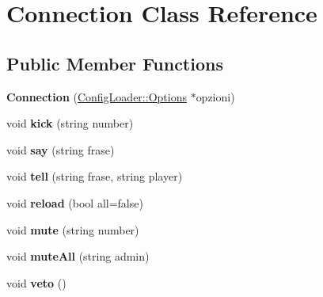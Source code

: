 \hypertarget{class_connection}{
\section{Connection Class Reference}
\label{class_connection}
}
\subsection*{Public Member Functions}
\begin{DoxyCompactItemize}
\item 
\hypertarget{class_connection_a1c52a021de2615a8576c13c5929c5afa}{
{\bfseries Connection} (\hyperlink{class_config_loader_1_1_options}{ConfigLoader::Options} $\ast$opzioni)}
\label{class_connection_a1c52a021de2615a8576c13c5929c5afa}

\item 
\hypertarget{class_connection_a7813b0b020f547355a68d20abadbe26c}{
void {\bfseries kick} (string number)}
\label{class_connection_a7813b0b020f547355a68d20abadbe26c}

\item 
\hypertarget{class_connection_aa4e1b688ca5d68b99a80d89103c28cee}{
void {\bfseries say} (string frase)}
\label{class_connection_aa4e1b688ca5d68b99a80d89103c28cee}

\item 
\hypertarget{class_connection_a5705beaa392572a3d40a23d71ec7811c}{
void {\bfseries tell} (string frase, string player)}
\label{class_connection_a5705beaa392572a3d40a23d71ec7811c}

\item 
\hypertarget{class_connection_ae9d95eb80bd0aceb0cdbb45fb1df3c24}{
void {\bfseries reload} (bool all=false)}
\label{class_connection_ae9d95eb80bd0aceb0cdbb45fb1df3c24}

\item 
\hypertarget{class_connection_ae322505a7c768417ebdb684d6ed84f0f}{
void {\bfseries mute} (string number)}
\label{class_connection_ae322505a7c768417ebdb684d6ed84f0f}

\item 
\hypertarget{class_connection_a10a01f616214d104e7e2acd344441507}{
void {\bfseries muteAll} (string admin)}
\label{class_connection_a10a01f616214d104e7e2acd344441507}

\item 
\hypertarget{class_connection_a47b29878725c5ab019011e182ec1304a}{
void {\bfseries veto} ()}
\label{class_connection_a47b29878725c5ab019011e182ec1304a}


\end{DoxyCompactItemize}
